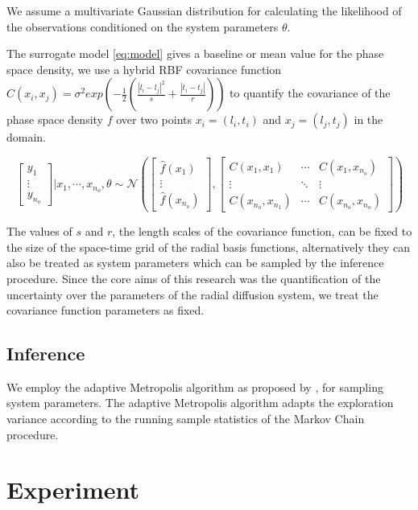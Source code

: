 \documentclass{article}
\begin{document}
We assume a multivariate Gaussian distribution for calculating the likelihood of 
the observations conditioned on the system parameters $\theta$. 

The surrogate model \ref{eq:model} gives a baseline or mean value for the phase space density, we use a
hybrid RBF covariance function $C(x_{i}, x_{j}) = \sigma^2 exp(-\frac{1}{2} (\frac{|l_i - l_j|^2}{s} + \frac{|t_i - t_j|}{r}))$
to quantify the covariance of the phase space density $f$ over two points 
$x_i = (l_i, t_i)$ and $x_j = (l_j, t_j)$ in the domain. 

\begin{equation}
\begin{bmatrix}
y_1\\ 
\vdots\\ 
y_{n_o}
\end{bmatrix} | x_1, \cdots, x_{n_o}, \theta \sim \mathcal{N} \left(\begin{bmatrix}
\hat{f}(x_1)\\ 
\vdots\\ 
\hat{f}(x_{n_o})
\end{bmatrix}, \begin{bmatrix}
C(x_1, x_1) & \cdots  & C(x_1, x_{n_o})\\ 
\vdots & \ddots & \vdots\\ 
C(x_{n_o}, x_{n_{1}}) & \cdots  & C(x_{n_o}, x_{n_{o}})
\end{bmatrix} \right )
\end{equation}

The values of $s$ and $r$, the length scales of the covariance function, 
can be fixed to the size of the space-time grid of the radial basis functions, 
alternatively they can also be treated as system parameters which can be sampled 
by the inference procedure. Since the core aims of this research was the quantification
of the uncertainty over the parameters of the radial diffusion system, 
we treat the covariance function parameters as fixed.

\subsection{Inference}

We employ the adaptive Metropolis algorithm as proposed by \citet{haario2001}, for sampling
system parameters. The adaptive Metropolis algorithm adapts the exploration variance according
to the running sample statistics of the Markov Chain procedure.


\section{Experiment}
\end{document}
